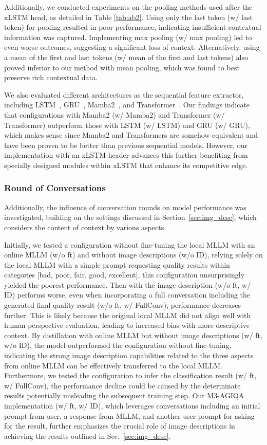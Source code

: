 Additionally, we conducted experiments on the pooling methods used after the xLSTM head, as detailed in Table \ref{tab:ab2}.
Using only the last token (w/ last token) for pooling resulted in poor performance, indicating insufficient contextual information was captured.
Implementing max pooling (w/ max pooling) led to even worse outcomes, suggesting a significant loss of context.
Alternatively, using a mean of the first and last tokens (w/ mean of the first and last tokens) also proved inferior to our method with mean pooling, which was found to best preserve rich contextual data.

We also evaluated different architectures as the sequential feature extractor, including LSTM~\cite{hochreiter1997long}, GRU~\cite{cho2014learning}, Mamba2~\cite{mamba2}, and Transformer~\cite{vaswani2017attention}.
Our findings indicate that configurations with Mamba2 (w/ Mamba2) and Transformer (w/ Transformer) outperform those with LSTM (w/ LSTM) and GRU (w/ GRU), which makes sense since Mamba2 and Transformers are somehow equivalent and have been proven to be better than previous sequential models.
However, our implementation with an xLSTM header advances this further benefiting from specially designed modules within xLSTM that enhance its competitive edge.

\subsubsection{Round of Conversations}
Additionally, the influence of conversation rounds on model performance was investigated, building on the settings discussed in Section~\ref{sec:img_desc}, which considers the content of context by various aspects.

Initially, we tested a configuration without fine-tuning the local MLLM with an online MLLM (w/o ft) and without image descriptions (w/o ID), relying solely on the local MLLM with a simple prompt requesting quality results within categories [bad, poor, fair, good, excellent], this configuration unsurprisingly yielded the poorest performance.
Then with the image description (w/o ft, w/ ID) performs worse,
even when incorporating a full conversation including the generated final quality result (w/o ft, w/ FullConv), performance decreases further.
This is likely because the original local MLLM did not align well with human perspective evaluation, leading to increased bias with more descriptive context.
By distillation with online MLLM but without image descriptions (w/ ft, w/o ID), the model outperformed the configuration without fine-tuning, indicating the strong image description capabilities related to the three aspects from online MLLM can be effectively transferred to the local MLLM.
Furthermore, we tested the configuration to infer the classification result (w/ ft, w/ FullConv), the performance decline could be caused by the determinate results potentially misleading the subsequent training step.
Our M3-AGIQA implementation (w/ ft, w/ ID), which leverages conversations including an initial prompt from user, a response from MLLM, and another user prompt for asking for the result, further emphasizes the crucial role of image descriptions in achieving the results outlined in Sec.~\ref{sec:img_desc}.

